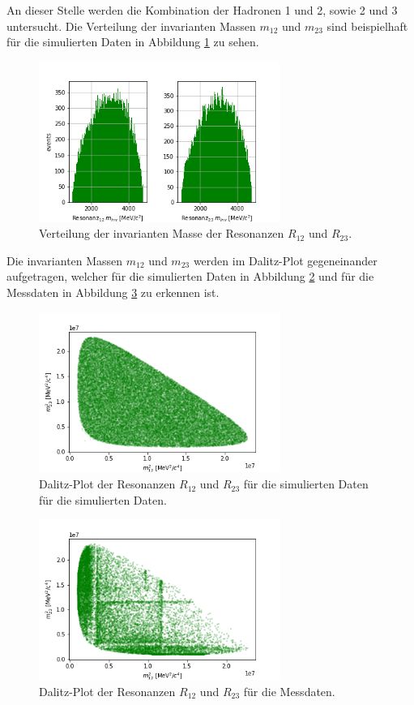 An dieser Stelle werden die Kombination der Hadronen 1 und 2, sowie 2 und 3 untersucht. Die Verteilung der invarianten Massen $m_{12}$ und $m_{23}$ sind beispielhaft für die simulierten Daten in Abbildung \ref{fig:HistRes} zu sehen. 
\begin{figure}
  \centering
  \includegraphics[width=0.7\textwidth]{plots/sim_Xmes_M.png}
  \caption{Verteilung der invarianten Masse der Resonanzen $R_{12}$ und $R_{23}$.}
  \label{fig:HistRes}
\end{figure} 
\FloatBarrier
Die invarianten Massen $m_{12}$ und $m_{23}$ werden im Dalitz-Plot gegeneinander aufgetragen, welcher für die simulierten Daten in Abbildung \ref{fig:Dalitz_sim} und für die Messdaten in Abbildung \ref{fig:Dalitz_real} zu erkennen ist.
\begin{figure}
  \centering
  \includegraphics[width=0.7\textwidth]{plots/dalitz_sim.png}
  \caption{Dalitz-Plot der Resonanzen $R_{12}$ und $R_{23}$ für die simulierten Daten für die simulierten Daten.}
  \label{fig:Dalitz_sim}
\end{figure} 
\FloatBarrier
\begin{figure}
  \centering
  \includegraphics[width=0.7\textwidth]{plots/dalitz_real.png}
  \caption{Dalitz-Plot der Resonanzen $R_{12}$ und $R_{23}$ für die Messdaten.}
  \label{fig:Dalitz_real}
\end{figure} 
